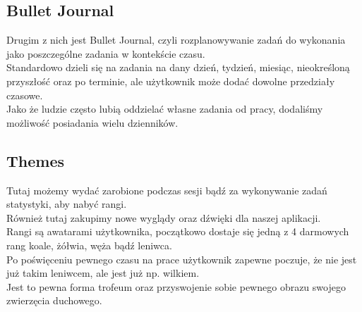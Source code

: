 \documentclass[a4paper,11pt]{report}
\begin{document}
\subsection{Bullet Journal}
Drugim z nich jest Bullet Journal, czyli rozplanowywanie zadań do wykonania jako poszczególne zadania w kontekście czasu.
\\Standardowo dzieli się na zadania na dany dzień, tydzień, miesiąc, nieokreśloną przyszłość oraz po terminie, ale użytkownik może dodać dowolne przedziały czasowe.
\\Jako że ludzie często lubią oddzielać własne zadania od pracy, dodaliśmy możliwość posiadania wielu dzienników.
\subsection{Themes}
Tutaj możemy wydać zarobione podczas sesji bądź za wykonywanie zadań statystyki, aby nabyć rangi.
\\Również tutaj zakupimy nowe wyglądy oraz dźwięki dla naszej aplikacji.
\\Rangi są awatarami użytkownika, początkowo dostaje się jedną z 4 darmowych rang koale, żółwia, węża bądź leniwca.
\\Po poświęceniu pewnego czasu na prace użytkownik zapewne poczuje, że nie jest już takim leniwcem, ale jest już np. wilkiem.
\\Jest to pewna forma trofeum oraz przyswojenie sobie pewnego obrazu swojego zwierzęcia duchowego.
\end{document}
